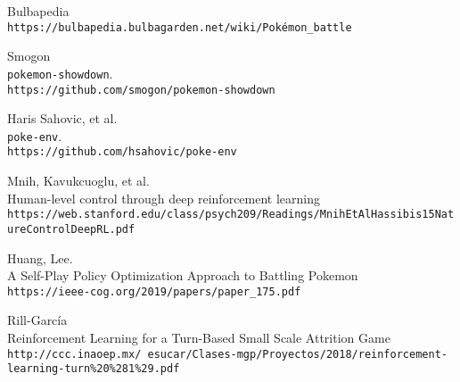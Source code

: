 \documentclass{article}
\begin{document}
\begin{thebibliography}{9}
    Bulbapedia\\
    \texttt{https://bulbapedia.bulbagarden.net/wiki/Pokémon\_battle}

    Smogon\\
    \texttt{pokemon-showdown}. \\
    \texttt{https://github.com/smogon/pokemon-showdown}

    Haris Sahovic, et al.\\
    \texttt{poke-env}. \\
    \texttt{https://github.com/hsahovic/poke-env}
    
    Mnih, Kavukcuoglu, et al.\\
    Human-level control through deep reinforcement learning\\
    \texttt{https://web.stanford.edu/class/psych209/Readings/MnihEtAlHassibis15NatureControlDeepRL.pdf}

    Huang, Lee.\\
    A Self-Play Policy Optimization Approach to Battling Pokemon \\
    \texttt{https://ieee-cog.org/2019/papers/paper\_175.pdf}

    Rill-García\\
    Reinforcement Learning for a Turn-Based Small Scale Attrition Game\\
    \texttt{http://ccc.inaoep.mx/~esucar/Clases-mgp/Proyectos/2018/reinforcement-learning-turn\%20\%281\%29.pdf}
\end{thebibliography}
\end{document}
